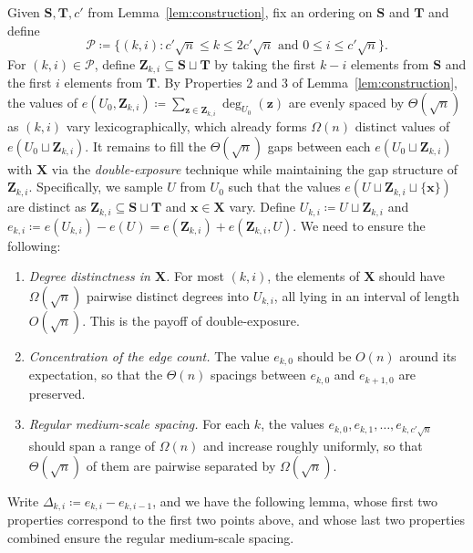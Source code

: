 Given $\mathbf{S}, \mathbf{T}, c'$ from Lemma~\ref{lem:construction}, fix an ordering on $\mathbf{S}$ and $\mathbf{T}$ and define
\[
  \mathcal{P} \coloneqq \bigl\{(k, i) : c'\sqrt{n} \leq k \leq 2c'\sqrt{n} \text{ and } 0 \leq i \leq c'\sqrt{n}\bigr\}.
\]
For $(k, i) \in \mathcal{P}$, define $\mathbf{Z}_{k, i} \subseteq \mathbf{S} \sqcup \mathbf{T}$ by taking the first $k - i$ elements from $\mathbf{S}$ and the first $i$ elements from $\mathbf{T}$. By Properties 2 and 3 of Lemma~\ref{lem:construction}, the values of $e(U_0, \mathbf{Z}_{k, i}) \coloneqq \sum_{\mathbf{z} \in \mathbf{Z}_{k, i}} \deg_{U_0}(\mathbf{z})$ are evenly spaced by $\Theta(\sqrt{n})$ as $(k, i)$ vary lexicographically, which already forms $\Omega(n)$ distinct values of $e(U_0 \sqcup \mathbf{Z}_{k, i})$. It remains to fill the $\Theta(\sqrt{n})$ gaps between each $e(U_0 \sqcup \mathbf{Z}_{k, i})$ with $\mathbf{X}$ via the \textit{double-exposure} technique while maintaining the gap structure of $\mathbf{Z}_{k, i}$. Specifically, we sample $U$ from $U_0$ such that the values $e(U \sqcup \mathbf{Z}_{k, i} \sqcup \{\mathbf{x}\})$ are distinct as $\mathbf{Z}_{k, i} \subseteq \mathbf{S} \sqcup \mathbf{T}$ and $\mathbf{x} \in \mathbf{X}$ vary. Define $U_{k,i} \coloneqq U \sqcup \mathbf{Z}_{k,i}$ and $e_{k, i} \coloneqq e(U_{k, i}) - e(U) = e(\mathbf{Z}_{k,i}) + e(\mathbf{Z}_{k,i}, U)$. We need to ensure the following:
\begin{enumerate}
  \item \emph{Degree distinctness in $\mathbf{X}$.} For most $(k, i)$, the elements of $\mathbf{X}$ should have $\Omega(\sqrt{n})$ pairwise distinct degrees into $U_{k,i}$, all lying in an interval of length $O(\sqrt{n})$. This is the payoff of double-exposure.
    \item \emph{Concentration of the edge count.} The value $e_{k,0}$ should be $O(n)$ around its expectation, so that the $\Theta(n)$ spacings between $e_{k, 0}$ and $e_{k + 1, 0}$ are preserved.
  \item \emph{Regular medium-scale spacing.} For each $k$, the values $e_{k,0}, e_{k,1}, \ldots, e_{k, c'\sqrt{n}}$ should span a range of $\Omega(n)$ and increase roughly uniformly, so that $\Theta(\sqrt{n})$ of them are pairwise separated by $\Omega(\sqrt{n})$.
\end{enumerate}

Write $\Delta_{k, i} \coloneqq e_{k, i} - e_{k, i - 1}$, and we have the following lemma, whose first two properties correspond to the first two points above, and whose last two properties combined ensure the regular medium-scale spacing. 

